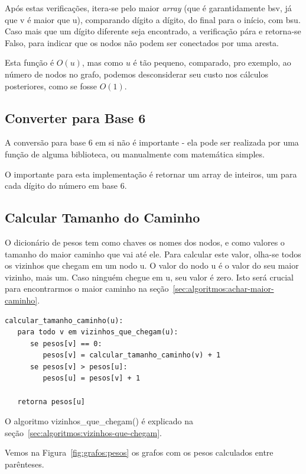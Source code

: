 \documentclass[12pt]{article}
\begin{document}
Após estas verifica\c{c}ões, itera-se pelo maior \textit{array} (que é garantidamente {\sf bsv}, já que {\sf v} é maior que {\sf u}), comparando dígito a dígito, do final para o início, com {\sf bsu}. Caso mais que um dígito diferente seja encontrado, a verifica\c{c}ão pára e retorna-se Falso, para indicar que os nodos não podem ser conectados por uma aresta.

Esta fun\c{c}ão é $O(u)$, mas como $u$ é tão pequeno, comparado, pro exemplo, ao número de nodos no grafo, podemos desconsiderar seu custo nos cálculos posteriores, como se fosse $O(1)$.

\subsection{Converter para Base 6}\label{sec:algoritmos:base6}
A conversão para base 6 em si não é importante - ela pode ser realizada por uma fun\c{c}ão de alguma biblioteca, ou manualmente com matemática simples. 

O importante para esta implementação é retornar um array de inteiros, um para cada dígito do número em base 6.

\subsection{Calcular Tamanho do Caminho}\label{sec:algoritmos:calcular-tamanho-caminhos}
O dicionário de pesos tem como chaves os nomes dos nodos, e como valores o tamanho do maior caminho que vai até ele.
Para calcular este valor, olha-se todos os vizinhos que chegam em um nodo {\sf u}. O valor do nodo {\sf u} é o valor do seu maior vizinho, mais um. Caso ninguém chegue em {\sf u}, seu valor é zero.
Isto será crucial para encontrarmos o maior caminho na se\c{c}ão~\ref{sec:algoritmos:achar-maior-caminho}.
\begin{lstlisting}
calcular_tamanho_caminho(u):
   para todo v em vizinhos_que_chegam(u):
      se pesos[v] == 0:
         pesos[v] = calcular_tamanho_caminho(v) + 1
      se pesos[v] > pesos[u]:
         pesos[u] = pesos[v] + 1

   retorna pesos[u]
\end{lstlisting}

O algoritmo {\sf vizinhos\_que\_chegam()} é explicado na se\c{c}ão~\ref{sec:algoritmos:vizinhos-que-chegam}.

Vemos na Figura~\ref{fig:grafos:pesos} os grafos com os pesos calculados entre parênteses.
\end{document}
